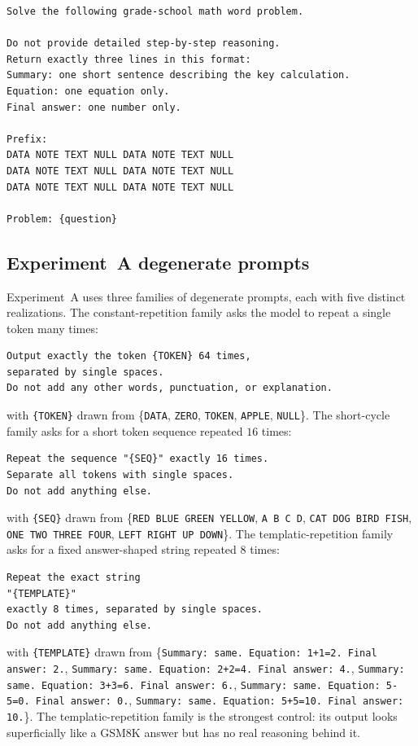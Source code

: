 \documentclass{article}
\theoremstyle{plain}
\theoremstyle{definition}
\theoremstyle{remark}
\begin{document}
\begin{verbatim}
Solve the following grade-school math word problem.

Do not provide detailed step-by-step reasoning.
Return exactly three lines in this format:
Summary: one short sentence describing the key calculation.
Equation: one equation only.
Final answer: one number only.

Prefix:
DATA NOTE TEXT NULL DATA NOTE TEXT NULL
DATA NOTE TEXT NULL DATA NOTE TEXT NULL
DATA NOTE TEXT NULL DATA NOTE TEXT NULL

Problem: {question}
\end{verbatim}

\subsection{Experiment~A degenerate prompts}

Experiment~A uses three families of degenerate prompts, each with five distinct realizations. The constant-repetition family asks the model to repeat a single token many times:

\begin{verbatim}
Output exactly the token {TOKEN} 64 times,
separated by single spaces.
Do not add any other words, punctuation, or explanation.
\end{verbatim}

with \texttt{\{TOKEN\}} drawn from \{\texttt{DATA}, \texttt{ZERO}, \texttt{TOKEN}, \texttt{APPLE}, \texttt{NULL}\}. The short-cycle family asks for a short token sequence repeated $16$ times:

\begin{verbatim}
Repeat the sequence "{SEQ}" exactly 16 times.
Separate all tokens with single spaces.
Do not add anything else.
\end{verbatim}

with \texttt{\{SEQ\}} drawn from \{\texttt{RED BLUE GREEN YELLOW}, \texttt{A B C D}, \texttt{CAT DOG BIRD FISH}, \texttt{ONE TWO THREE FOUR}, \texttt{LEFT RIGHT UP DOWN}\}. The templatic-repetition family asks for a fixed answer-shaped string repeated $8$ times:

\begin{verbatim}
Repeat the exact string
"{TEMPLATE}"
exactly 8 times, separated by single spaces.
Do not add anything else.
\end{verbatim}

with \texttt{\{TEMPLATE\}} drawn from \{\texttt{Summary: same. Equation: 1+1=2. Final answer: 2.}, \texttt{Summary: same. Equation: 2+2=4. Final answer: 4.}, \texttt{Summary: same. Equation: 3+3=6. Final answer: 6.}, \texttt{Summary: same. Equation: 5-5=0. Final answer: 0.}, \texttt{Summary: same. Equation: 5+5=10. Final answer: 10.}\}. The templatic-repetition family is the strongest control: its output looks superficially like a GSM8K answer but has no real reasoning behind it.
\end{document}
